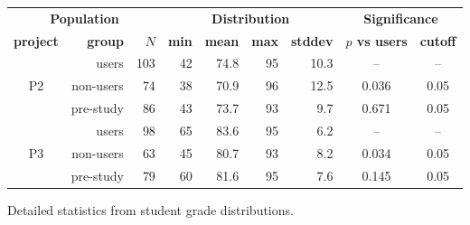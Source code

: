 \begin{figure}[h]
	\begin{center}
		\small
	\begin{tabular}{cr|r||r|r|r|r||cc}
		\multicolumn{3}{c||}{\bf Population} & \multicolumn{4}{c||}{\bf Distribution} & \multicolumn{2}{c}{\bf Significance} \\
		\bf project & \bf group & $N$ & \bf min & \bf mean & \bf max & \bf stddev & \bf $p$ vs users & \bf cutoff\\
		\hline
			& users		& 103	& 42	& 74.8	& 95	& 10.3	& --	& --	\\
		P2	& non-users	& 74	& 38	& 70.9	& 96	& 12.5	& 0.036	& 0.05	\\
			& pre-study	& 86	& 43	& 73.7	& 93	& 9.7	& 0.671	& 0.05	\\
			\hline
			& users		& 98	& 65	& 83.6	& 95	& 6.2	& --	& --	\\
		P3	& non-users	& 63	& 45	& 80.7	& 93	& 8.2	& 0.034	& 0.05	\\
			& pre-study	& 79	& 60	& 81.6	& 95	& 7.6	& 0.145	& 0.05	\\
	\end{tabular}
	\end{center}
	\caption{Detailed statistics from student grade distributions.}
	\label{tab:table-of-ze-studence}
\end{figure}

